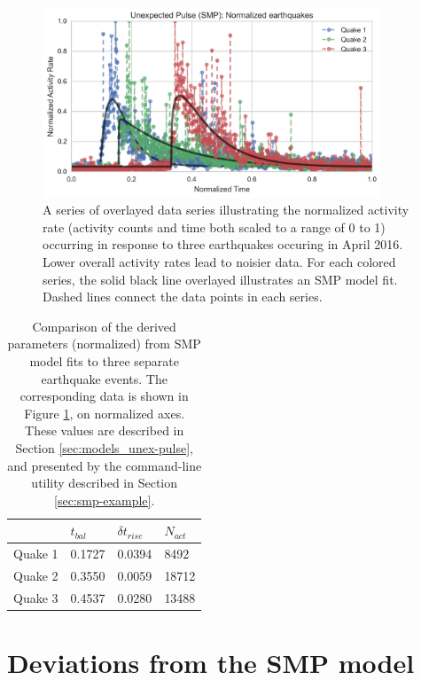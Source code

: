 \documentclass{article}
\begin{document}
\begin{figure}[!h]
\centering
\includegraphics[width=0.9\textwidth]{img/compare-quakes.png}
\caption{A series of overlayed data series illustrating the normalized activity rate (activity counts and time both scaled to a range of 0 to 1) occurring in response to three earthquakes occuring in April 2016. Lower overall activity rates lead to noisier data. For each colored series, the solid black line overlayed illustrates an SMP model fit. Dashed lines connect the data points in each series.} 
\label{fig:smp-fit-comparison}
\end{figure}

\begin{table}[!h]
\centering
\begin{tabular}{ p{2cm} | p{2cm} | p{2cm} | p{2cm} }
\hline
        & $t_{bal}$ & $\delta t_{rise}$ & $N_{act}$ \tabularnewline     \hline
Quake 1 & 0.1727    & 0.0394            & 8492      \tabularnewline     \hline
Quake 2 & 0.3550    & 0.0059            & 18712     \tabularnewline     \hline
Quake 3 & 0.4537    & 0.0280            & 13488     \tabularnewline     \hline
\end{tabular}
\caption{Comparison of the derived parameters (normalized) from SMP model fits to three separate earthquake events. The corresponding data is shown in Figure \ref{fig:smp-fit-comparison}, on normalized axes. These values are described in Section \ref{sec:models_unex-pulse}, and presented by the command-line utility described in Section \ref{sec:smp-example}.} 
\label{tab:pulse-comparison}
\end{table}




\section{Deviations from the SMP model}
\label{sec:pulse-deviations}
\end{document}
